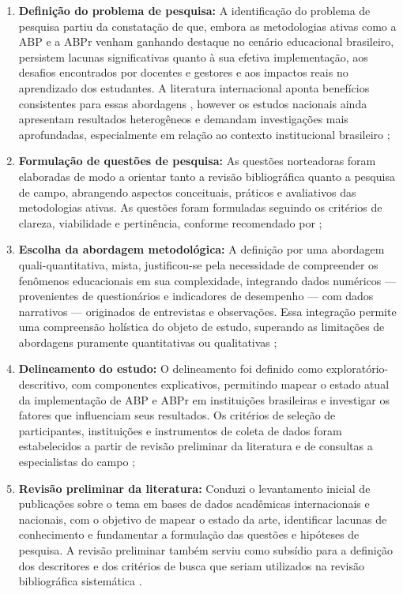 \begin{enumerate}
    \item \textbf{Definição do problema de pesquisa:} A identificação do problema de pesquisa partiu da constatação de que, embora as metodologias ativas como a ABP e a ABPr venham ganhando destaque no cenário educacional brasileiro, persistem lacunas significativas quanto à sua efetiva implementação, aos desafios encontrados por docentes e gestores e aos impactos reais no aprendizado dos estudantes. A literatura internacional aponta benefícios consistentes para essas abordagens \cite{CRESWELL2018}, however os estudos nacionais ainda apresentam resultados heterogêneos e demandam investigações mais aprofundadas, especialmente em relação ao contexto institucional brasileiro \cite{SANTOS2024};
    \item \textbf{Formulação de questões de pesquisa:} As questões norteadoras foram elaboradas de modo a orientar tanto a revisão bibliográfica quanto a pesquisa de campo, abrangendo aspectos conceituais, práticos e avaliativos das metodologias ativas. As questões foram formuladas seguindo os critérios de clareza, viabilidade e pertinência, conforme recomendado por \cite{CRESWELL2018};
    \item \textbf{Escolha da abordagem metodológica:} A definição por uma abordagem quali-quantitativa, mista, justificou-se pela necessidade de compreender os fenômenos educacionais em sua complexidade, integrando dados numéricos — provenientes de questionários e indicadores de desempenho — com dados narrativos — originados de entrevistas e observações. Essa integração permite uma compreensão holística do objeto de estudo, superando as limitações de abordagens puramente quantitativas ou qualitativas \cite{CRESWELL2018};
    \item \textbf{Delineamento do estudo:} O delineamento foi definido como exploratório-descritivo, com componentes explicativos, permitindo mapear o estado atual da implementação de ABP e ABPr em instituições brasileiras e investigar os fatores que influenciam seus resultados. Os critérios de seleção de participantes, instituições e instrumentos de coleta de dados foram estabelecidos a partir de revisão preliminar da literatura e de consultas a especialistas do campo \cite{SANTOS2024};
    \item \textbf{Revisão preliminar da literatura:} Conduzi o levantamento inicial de publicações sobre o tema em bases de dados acadêmicas internacionais e nacionais, com o objetivo de mapear o estado da arte, identificar lacunas de conhecimento e fundamentar a formulação das questões e hipóteses de pesquisa. A revisão preliminar também serviu como subsídio para a definição dos descritores e dos critérios de busca que seriam utilizados na revisão bibliográfica sistemática \cite{BARDIN2016}.
\end{enumerate}

